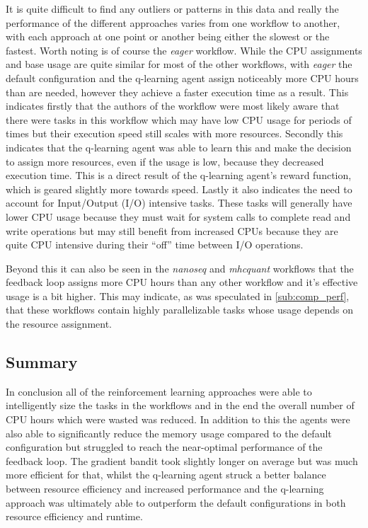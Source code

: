It is quite difficult to find any outliers or patterns in this data and really the performance of the different approaches varies from one workflow to another, with each approach at one point or another being either the slowest or the fastest. Worth noting is of course the \textit{eager} workflow. While the CPU assignments and base usage are quite similar for most of the other workflows, with \textit{eager} the default configuration and the q-learning agent assign noticeably more CPU hours than are needed, however they achieve a faster execution time as a result. This indicates firstly that the authors of the workflow were most likely aware that there were tasks in this workflow which may have low CPU usage for periods of times but their execution speed still scales with more resources. Secondly this indicates that the q-learning agent was able to learn this and make the decision to assign more resources, even if the usage is low, because they decreased execution time. This is a direct result of the q-learning agent’s reward function, which is geared slightly more towards speed. Lastly it also indicates the need to account for Input/Output (I/O) intensive tasks. These tasks will generally have lower CPU usage because they must wait for system calls to complete read and write operations but may still benefit from increased CPUs because they are quite CPU intensive during their “off” time between I/O operations.

Beyond this it can also be seen in the \textit{nanoseq} and \textit{mhcquant} workflows that the feedback loop assigns more CPU hours than any other workflow and it’s effective usage is a bit higher. This may indicate, as was speculated in \ref{sub:comp_perf}, that these workflows contain highly parallelizable tasks whose usage depends on the resource assignment.

\subsection{Summary}
\label{sub:summary}

In conclusion all of the reinforcement learning approaches were able to intelligently size the tasks in the workflows and in the end the overall number of CPU hours which were wasted was reduced. In addition to this the agents were also able to significantly reduce the memory usage compared to the default configuration but struggled to reach the near-optimal performance of the feedback loop. The gradient bandit took slightly longer on average but was much more efficient for that, whilst the q-learning agent struck a better balance between resource efficiency and increased performance and the q-learning approach was ultimately able to outperform the default configurations in both resource efficiency and runtime.

